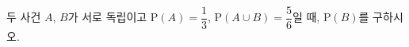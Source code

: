 두 사건 $A$, $B$가 서로 독립이고 $\mathrm{P}(A)=\dfrac{1}{3}$, $\mathrm{P}(A\cup B)=\dfrac{5}{6}$일 때, $\mathrm{P}(B)$를 구하시오.
